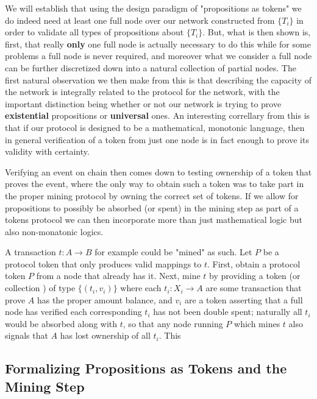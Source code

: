 \documentclass[12pt]{amsart}
\begin{document}
 We will establish that using the design paradigm of "propositions as tokens" we do indeed need at least one full node over our network constructed from $\{T_i\}$ in order to validate all types of propositions about $\{T_i\}$. But, what is then shown is, first, that really \textbf{only} one full node is actually necessary to do this while for some problems a full node is never required, and moreover what we consider a full node can be further discretized down into a natural collection of partial nodes. The first natural observation we then make from this is that describing the capacity of the network is integrally related to the protocol for the network, with the important distinction being whether or not our network is trying to prove \textbf{existential} propositions or \textbf{universal} ones. An interesting correllary from this is that if our protocol is designed to be a mathematical, monotonic language, then in general verification of a token from just one node is in fact enough to prove its validity with certainty.  \newline

Verifying an event on chain then comes down to testing ownership of a token that proves the event, where the only way to obtain such a token was to take part in the proper mining protocol by owning the correct set of tokens. If we allow for propositions to possibly be absorbed (or spent) in the mining step as part of a tokens protocol we can then incorporate more than just mathematical logic but also non-monatonic logics.\newline

A transaction $t:A\rightarrow B$ for example could be "mined" as such. Let $P$ be a protocol token that only produces valid mappings to $t$. First, obtain a protocol token $P$ from a node that already has it. Next, mine $t$ by providing a token (or collection ) of type $\{(t_i,v_i)\}$ where each $t_i:X_i\rightarrow A$ are some transaction that prove $A$ has the proper amount balance, and $v_i$ are a token asserting that a full node has verified each corresponding $t_i$ has not been double spent; naturally all $t_i$ would be absorbed along with $t$, so that any node running $P$ which mines $t$ also signals that $A$ has lost ownership of all $t_i$. This 

\subsection{Formalizing Propositions as Tokens and the Mining Step}
\end{document}
